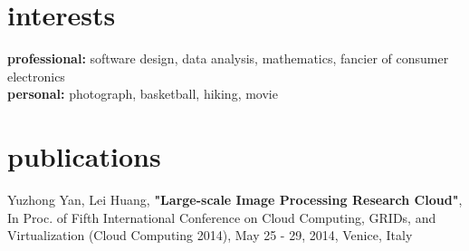 \documentclass[]{friggeri-cv} %
\begin{document}


\section{interests}

\textbf{professional:} software design, data analysis, mathematics, fancier of consumer electronics 
\\\textbf{personal:} photograph, basketball, hiking, movie


\section{publications}


Yuzhong Yan, Lei Huang, \textbf{"Large-scale Image Processing Research Cloud"}, In Proc. of Fifth International Conference on Cloud Computing, GRIDs, and Virtualization (Cloud Computing 2014), May 25 - 29, 2014, Venice, Italy


\begin{refsection} %
\nocite{*}
\printbibliography[sorting=chronological, type=inproceedings, title={international peer-reviewed conferences/proceedings}, notkeyword={france}, heading=subbibliography]
\end{refsection}
\end{document}
